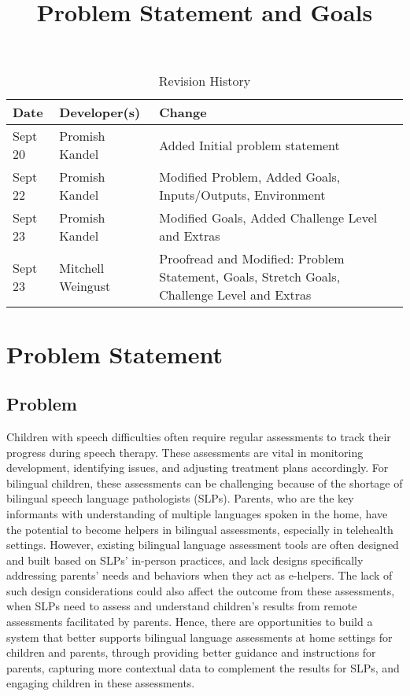 \documentclass{article}
\title{Problem Statement and Goals\\\progname}
\author{\authname}
\date{}
\begin{document}
\maketitle

\begin{table}[hp]
\caption{Revision History} \label{TblRevisionHistory}
\begin{tabularx}{\textwidth}{llX}
\toprule
\textbf{Date} & \textbf{Developer(s)} & \textbf{Change}\\
\midrule
Sept 20 & Promish Kandel& Added Initial problem statement\\
Sept 22 & Promish Kandel & Modified Problem, Added Goals, Inputs/Outputs, Environment\\
Sept 23 & Promish Kandel & Modified Goals, Added Challenge Level and Extras\\
Sept 23 & Mitchell Weingust & Proofread and Modified: Problem Statement, Goals, Stretch Goals, Challenge Level and Extras\\
\bottomrule
\end{tabularx}
\end{table}

\section{Problem Statement}


\subsection{Problem}
\hspace{2em}Children with speech difficulties often require regular assessments to track their progress
during speech therapy. These assessments are vital in monitoring development, identifying issues, and
adjusting treatment plans accordingly. For bilingual children, these assessments can be challenging
because of the shortage of bilingual  speech language pathologists (SLPs).  Parents, who are the key
informants with understanding of multiple languages spoken in the home, have the potential to become
helpers in bilingual assessments, especially in telehealth settings. However, existing bilingual language
assessment tools are often designed and built based on SLPs’ in-person practices, and lack designs
specifically addressing parents’ needs and behaviors when they act as e-helpers. The lack of such design
considerations could also affect the outcome from these assessments, when SLPs need to assess and understand
children’s results from remote assessments facilitated by parents. Hence, there are opportunities to build a
system that better supports bilingual language assessments at home settings for children and parents, through
providing better guidance and instructions for parents, capturing more contextual data to complement the
results for SLPs, and engaging children in these assessments.
\end{document}
